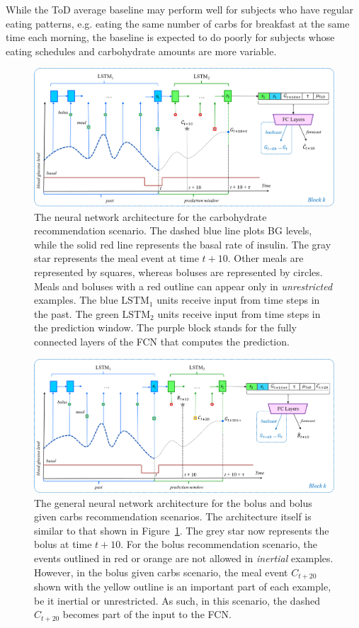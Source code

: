 \documentclass[journal,article,submit,moreauthors,pdftex]{Definitions/mdpi}
\begin{document}
While the ToD average baseline may perform well for subjects who have regular eating patterns, e.g. eating the same number of carbs for breakfast at the same time each morning, the baseline is expected to do poorly for subjects whose eating schedules and carbohydrate amounts are more variable.


\begin{figure}[t]
    \includegraphics[width=\textwidth]{carbs-block}
    \caption{The neural network architecture for the carbohydrate recommendation scenario. The dashed blue line plots BG levels, while the solid red line represents the basal rate of insulin. The gray star represents the meal event at time $t+10$. Other meals are represented by squares, whereas boluses are represented by circles. Meals and boluses with a red outline can appear only in {\it unrestricted} examples. The blue $\text{LSTM}_{1}$ units receive input from time steps in the past. The green $\text{LSTM}_{2}$ units receive input from time steps in the prediction window. The purple block stands for the fully connected layers of the FCN that computes the prediction.}
    \label{fig:carbs}
\end{figure}

\begin{figure}[t]
    \includegraphics[width=\textwidth]{bolus-block}
    \caption{The general neural network architecture for the bolus and bolus given carbs recommendation scenarios. The architecture itself is similar to that shown in Figure~\ref{fig:carbs}. The grey star now represents the bolus at time $t+10$. For the bolus recommendation scenario, the events outlined in red or orange are not allowed in {\it inertial} examples.  However, in the bolus given carbs scenario, the meal event $C_{t+20}$ shown with the yellow outline is an important part of each example, be it inertial or unrestricted. As such, in this scenario, the dashed $C_{t+20}$ becomes part of the input to the FCN.}
    \label{fig:bolus}
\end{figure}
\end{document}

